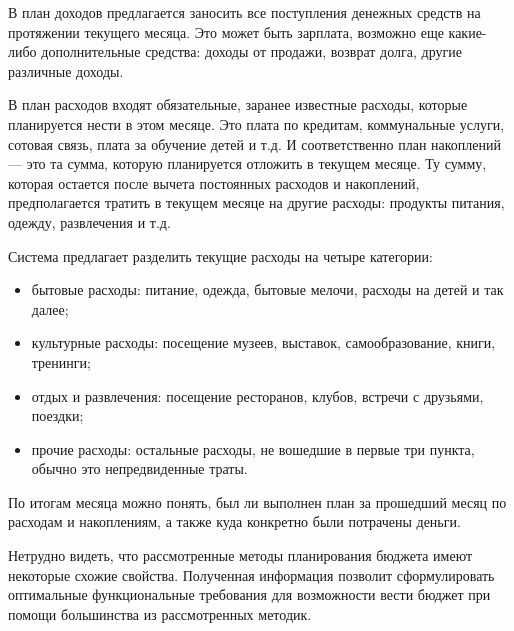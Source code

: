 В план доходов предлагается заносить все поступления денежных средств на протяжении текущего месяца.
Это может быть зарплата, возможно еще какие-либо дополнительные средства: доходы от продажи, возврат долга, другие различные доходы.

В план расходов входят обязательные, заранее известные расходы, которые планируется нести в этом месяце.
Это плата по кредитам, коммунальные услуги, сотовая связь, плата за обучение детей и т.д.
И соответственно план накоплений — это та сумма, которую планируется отложить в текущем месяце.
Ту сумму, которая остается после вычета постоянных расходов и накоплений, предполагается тратить в текущем месяце на другие расходы: продукты питания, одежду, развлечения и т.д.

Система предлагает разделить текущие расходы на четыре категории:
\begin{itemize}
    \item бытовые расходы: питание, одежда, бытовые мелочи, расходы на детей и так далее;
    \item культурные расходы: посещение музеев, выставок, самообразование, книги, тренинги;
    \item отдых и развлечения: посещение ресторанов, клубов, встречи с друзьями, поездки;
    \item прочие расходы: остальные расходы, не вошедшие в первые три пункта, обычно это непредвиденные траты.
\end{itemize}

По итогам месяца можно понять, был ли выполнен план за прошедший месяц по расходам и накоплениям, а также куда конкретно были потрачены деньги.

Нетрудно видеть, что рассмотренные методы планирования бюджета имеют некоторые схожие свойства.
Полученная информация позволит сформулировать оптимальные функциональные требования для возможности вести бюджет при помощи большинства из рассмотренных методик.